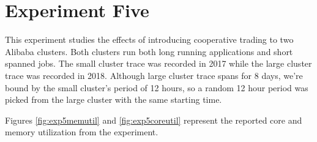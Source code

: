\section{Experiment Five}
\vspace{2em}
\begin{center}
\end{center}

This experiment studies the effects of introducing cooperative trading to two
Alibaba clusters. Both clusters run both long running applications and short
spanned jobs. The small cluster trace was recorded in 2017 while the large
cluster trace was recorded in 2018. Although large cluster trace spans for 8
days, we're bound by the small cluster's period of 12 hours, so a random 12
hour period was picked from the large cluster with the same starting time. 

Figures \ref{fig:exp5memutil} and \ref{fig:exp5coreutil} represent the reported core and memory utilization from
the experiment.

